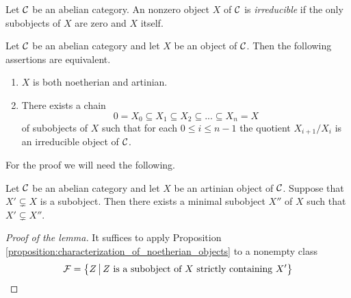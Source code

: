 \begin{definition}
Let ${\mathcal C}$ be an abelian category. An nonzero object $X$ of ${\mathcal C}$ is \textit{irreducible} if the only subobjects of $X$ are zero and $X$ itself.
\end{definition}

\begin{proposition}\label{proposition:characterization_of_objects_of_flength}
Let ${\mathcal C}$ be an abelian category and let $X$ be an object of ${\mathcal C}$. Then the following assertions are equivalent.
\begin{enumerate}[label=\emph{\textbf{(\roman*)}}, leftmargin=1.5em]
\item $X$ is both noetherian and artinian.
\item There exists a chain
$$0=X_0\subseteq X_1\subseteq X_2\subseteq ...\subseteq X_n = X$$
of subobjects of $X$ such that for each $0\leq i\leq n-1$ the quotient $X_{i+1}/X_i$ is an irreducible object of ${\mathcal C}$.
\end{enumerate}
\end{proposition}
\noindent
For the proof we will need the following.

\begin{lemma}\label{lemma:minimal_subobject_above_given_subobject}
Let ${\mathcal C}$ be an abelian category and let $X$ be an artinian object of ${\mathcal C}$. Suppose that $X'\subsetneq X$ is a subobject. Then there exists a minimal subobject $X''$ of $X$ such that $X'\subsetneq X''$.
\end{lemma}
\begin{proof}[Proof of the lemma]
It suffices to apply Proposition \ref{proposition:characterization_of_noetherian_objects} to a nonempty class
$${\mathcal F} = \big\{Z\,\big|\,Z\mbox{ is a subobject of }X\mbox{ strictly containing }X'\big\}$$
\end{proof}

